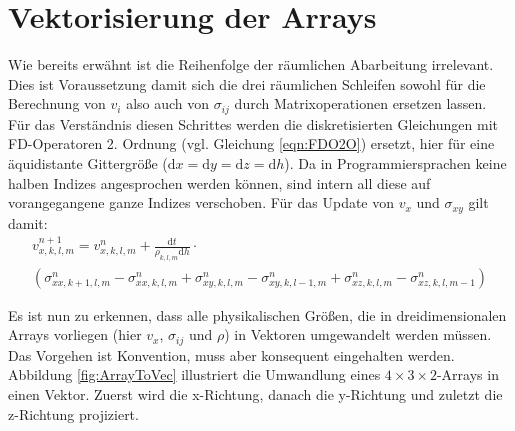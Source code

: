 \documentclass[pdftex,a4paper,parskip,listof=totoc,bibliography=totoc,onehalfspacing,12pt]{scrreprt}
\begin{document}
\section{Vektorisierung der Arrays}
Wie bereits erwähnt ist die Reihenfolge der räumlichen Abarbeitung irrelevant. Dies ist Voraussetzung damit sich die drei räumlichen Schleifen sowohl für die Berechnung von $v_i$ also auch von $\sigma_{ij}$ durch Matrixoperationen ersetzen lassen. Für das Verständnis diesen Schrittes werden die diskretisierten Gleichungen mit FD-Operatoren 2. Ordnung (vgl. Gleichung \ref{eqn:FDO2O}) ersetzt, hier für eine äquidistante Gittergröße ($\mathrm{d}x = \mathrm{d}y = \mathrm{d}z = \mathrm{d} h$). Da in Programmiersprachen keine halben Indizes angesprochen werden können, sind intern all diese auf vorangegangene ganze Indizes verschoben. Für das Update von $v_x$ und $\sigma_{xy}$ gilt damit:
\begin{multline}
	v_{x,k,l,m}^{n+1} = v_{x,k,l,m}^n + \frac{\mathrm{d}t}{\rho_{k,l,m} \mathrm{d}h} \cdot\\  \left( \sigma_{xx,k+1,l,m}^{n} - \sigma_{xx,k,l,m}^{n} + \sigma_{xy,k,l,m}^{n} - \sigma_{xy,k,l-1,m}^{n} + \sigma_{xz,k,l,m}^{n} - \sigma_{xz,k,l,m-1}^{n} \right)\label{eqn:exMV1}
\end{multline}

Es ist nun zu erkennen, dass alle physikalischen Größen, die in dreidimensionalen Arrays vorliegen (hier $v_x$, $\sigma_{ij}$ und $\rho$) in Vektoren umgewandelt werden müssen. Das Vorgehen ist Konvention, muss aber konsequent eingehalten werden. Abbildung \ref{fig:ArrayToVec} illustriert die Umwandlung eines $4 \times 3 \times 2$-Arrays in einen Vektor. Zuerst wird die x-Richtung, danach die y-Richtung und zuletzt die z-Richtung projiziert.
\end{document}
